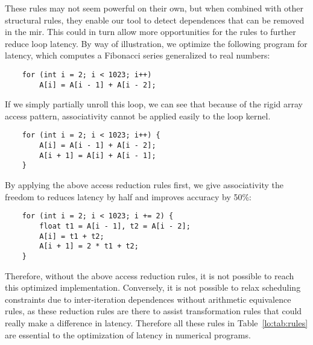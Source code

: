 These rules may not seem powerful on their own, but when combined with other
structural rules, they enable our tool to detect dependences that can be
removed in the \gls{mir}\@.  This could in turn allow more opportunities
for the rules to further reduce loop latency.  By way of illustration, we
optimize the following program for latency, which computes a Fibonacci series
generalized to real numbers:
\begin{lstlisting}
    for (int i = 2; i < 1023; i++)
        A[i] = A[i - 1] + A[i - 2];
\end{lstlisting}
If we simply partially unroll this loop, we can see that because of the
rigid array access pattern, associativity cannot be applied easily to the
loop kernel.
\begin{lstlisting}
    for (int i = 2; i < 1023; i++) {
        A[i] = A[i - 1] + A[i - 2];
        A[i + 1] = A[i] + A[i - 1];
    }
\end{lstlisting}
By applying the above access reduction rules first, we give associativity the
freedom to reduces latency by half and improves accuracy by 50\%:
\begin{lstlisting}
    for (int i = 2; i < 1023; i += 2) {
        float t1 = A[i - 1], t2 = A[i - 2];
        A[i] = t1 + t2;
        A[i + 1] = 2 * t1 + t2;
    }
\end{lstlisting}
Therefore, without the above access reduction rules, it is not possible to
reach this optimized implementation.  Conversely, it is not possible to relax
scheduling constraints due to inter-iteration dependences without arithmetic
equivalence rules, as these reduction rules are there to assist transformation
rules that could really make a difference in latency.  Therefore all these
rules in Table~\ref{lo:tab:rules} are essential to the optimization of latency
in numerical programs.
